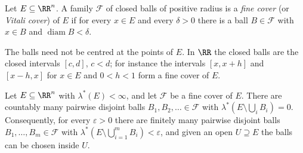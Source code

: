 \begin{definition}\label{lebesgue-differentiation:definition-fine-cover}
Let $E \subseteq \RR^n$. A family $\mathcal{F}$ of closed balls of positive radius is a \emph{fine cover} (or \emph{Vitali cover}) of $E$ if for every $x \in E$ and every $\delta > 0$ there is a ball $B \in \mathcal{F}$
with $x \in B$ and $\operatorname{diam}B < \delta$.
\end{definition}

The balls need not be centred at the points of $E$. In $\RR$ the closed balls are the closed intervals $[c, d]$, $c < d$; for instance the intervals $[x, x + h]$ and $[x - h, x]$ for $x \in E$ and
$0 < h < 1$ form a fine cover of $E$.

\begin{corollary}\label{lebesgue-differentiation:corollary-vitali-fine}
Let $E \subseteq \RR^n$ with $\lambda^*(E) < \infty$, and let $\mathcal{F}$ be a fine cover of $E$. There are countably many pairwise disjoint balls $B_1, B_2, \ldots \in \mathcal{F}$ with
$\lambda^*(E \setminus \bigcup_iB_i) = 0$. Consequently, for every $\varepsilon > 0$ there are finitely many pairwise disjoint balls $B_1, \ldots, B_m \in \mathcal{F}$ with
$\lambda^*(E \setminus \bigcup_{i=1}^mB_i) < \varepsilon$, and given an open $U \supseteq E$ the balls can be chosen inside $U$.
\end{corollary}

